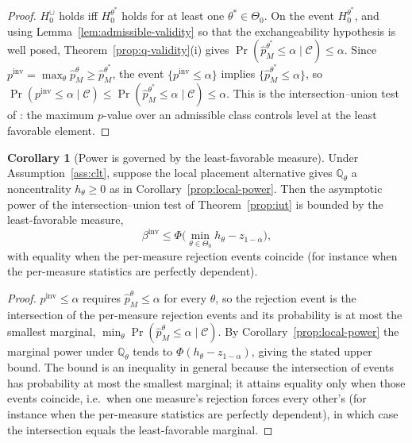 \documentclass[preprint,12pt]{elsarticle}
\theoremstyle{definition}
\newtheorem{corollary}[theorem]{Corollary}
\begin{document}
\begin{proof}
$H_0^{\cup}$ holds iff $H_0^{\theta^\ast}$ holds for at least one
$\theta^\ast\in\Theta_0$. On the event $H_0^{\theta^\ast}$, and using
Lemma~\ref{lem:admissible-validity} so that the exchangeability hypothesis is well
posed, Theorem~\ref{prop:q-validity}(i) gives
$\Pr(\hat p_M^{\theta^\ast}\le\alpha\mid\mathcal C)\le\alpha$. Since
$p^{\mathrm{inv}}=\max_\theta\hat p_M^\theta\ge\hat p_M^{\theta^\ast}$, the event
$\{p^{\mathrm{inv}}\le\alpha\}$ implies $\{\hat p_M^{\theta^\ast}\le\alpha\}$,
so
$\Pr(p^{\mathrm{inv}}\le\alpha\mid\mathcal C)\le\Pr(\hat
p_M^{\theta^\ast}\le\alpha\mid\mathcal C)\le\alpha$.
This is the intersection--union test of \cite{LehmannRomano2005}: the maximum
$p$-value over an admissible class controls level at the least favorable element.
\end{proof}

\begin{corollary}[Power is governed by the least-favorable measure]
\label{cor:iut-power}
Under Assumption~\ref{ass:clt}, suppose the local placement alternative gives
$\mathbb{Q}_\theta$ a noncentrality $h_\theta\ge0$ as in
Corollary~\ref{prop:local-power}. Then the asymptotic power of the
intersection--union test of Theorem~\ref{prop:iut} is bounded by the
least-favorable measure,
\[
\beta^{\mathrm{inv}}\le\Phi\big(\min_{\theta\in\Theta_0}h_\theta-z_{1-\alpha}\big),
\]
with equality when the per-measure rejection events coincide (for instance when
the per-measure statistics are perfectly dependent).
\end{corollary}

\begin{proof}
$p^{\mathrm{inv}}\le\alpha$ requires $\hat p_M^\theta\le\alpha$ for every
$\theta$, so the rejection event is the intersection of the per-measure rejection
events and its probability is at most the smallest marginal,
$\min_\theta\Pr(\hat p_M^\theta\le\alpha\mid\mathcal C)$. By
Corollary~\ref{prop:local-power} the marginal power under $\mathbb{Q}_\theta$
tends to $\Phi(h_\theta-z_{1-\alpha})$, giving the stated upper bound. The bound is
an inequality in general because the intersection of events has probability at most
the smallest marginal; it attains equality only when those events coincide, i.e.\
when one measure's rejection forces every other's (for instance when the
per-measure statistics are perfectly dependent), in which case the intersection
equals the least-favorable marginal.
\end{proof}
\end{document}
